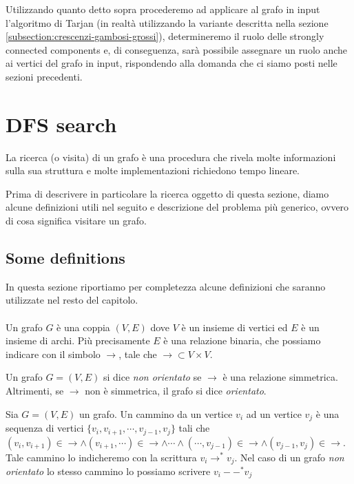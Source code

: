 Utilizzando quanto detto sopra procederemo ad applicare al grafo in
input l'algoritmo di Tarjan (in realt\`a utilizzando la variante
descritta nella sezione \ref{subsection:crescenzi-gambosi-grossi}),
determineremo il ruolo delle strongly connected components e, di
conseguenza, sar\`a possibile assegnare un ruolo anche ai vertici del
grafo in input, rispondendo alla domanda che ci siamo posti nelle
sezioni precedenti.

\section{DFS search}

La ricerca (o visita) di un grafo \`e una procedura che rivela molte
informazioni sulla sua struttura e molte implementazioni richiedono
tempo lineare.

Prima di descrivere in particolare la ricerca oggetto di questa
sezione, diamo alcune definizioni utili nel seguito e descrizione del
problema pi\`u generico, ovvero di cosa significa visitare un grafo.

\subsection{Some definitions}
\label{subsection:some-definitions}
In questa sezione riportiamo per completezza alcune definizioni che
saranno utilizzate nel resto del capitolo.
\\\\
Un grafo $G$ \`e una coppia $(V, E)$ dove $V$ \`e un insieme di
vertici ed $E$ \`e un insieme di archi. Pi\`u precisamente $E$ \`e una
relazione binaria, che possiamo indicare con il simbolo $\rightarrow$,
tale che $\rightarrow \subset V \times V$. 

Un grafo $G = (V, E)$ si dice \emph{non orientato} se $\rightarrow$
\`e una relazione simmetrica. Altrimenti, se $\rightarrow$ non \`e
simmetrica, il grafo si dice \emph{orientato}.

Sia $G = (V, E)$ un grafo. Un cammino da un vertice $v_{i}$ ad un
vertice $v_{j}$ \`e una sequenza di vertici $\{v_{i}, v_{i+1}, \cdots,
v_{j-1}, v_{j}\}$ tali che $(v_{i},v_{i+1}) \in \rightarrow \wedge
(v_{i+1}, \cdots) \in \rightarrow \wedge \cdots \wedge (\cdots,
v_{j-1}) \in \rightarrow \wedge (v_{j-1}, v_{j}) \in
\rightarrow$. Tale cammino lo indicheremo con la scrittura $v_{i}
\rightarrow^{*} v_{j}$. Nel caso di un grafo \emph{non orientato} lo
stesso cammino lo possiamo scrivere $v_{i} --^{*} v_{j}$

